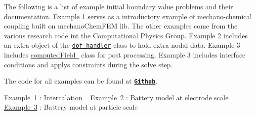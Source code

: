 The following is a list of example initial boundary value problems and their documentation. Example 1 serves as a introductory example of mechano-\/chemical coupling built on mechano\+Chem\+F\+EM lib. The other examples come from the various research code int the Computational Physics Group. Example 2 includes an extra object of the \href{https://www.dealii.org/8.5.0/doxygen/deal.II/classDoFHandler.html}{\tt dof\+\_\+handler} class to hold extra nodal data. Example 3 includes \mbox{\hyperlink{classcomputed_field}{computed\+Field }} class for post processing. Example 3 includes interface conditions and applys constraints during the solve step.

The code for all examples can be found at \href{https://github.com/mechanoChem/mechanoChemFEM/tree/example}{\tt {\bfseries Github}}.

\mbox{\hyperlink{_intercalation}{Example 1}} \+: Intercalation ~\newline
 \mbox{\hyperlink{battery_electrode_scale}{Example 2}} \+: Battery model at electrode scale~\newline
 \mbox{\hyperlink{battery_particle}{Example 3}} \+: Battery model at particle scale~\newline
